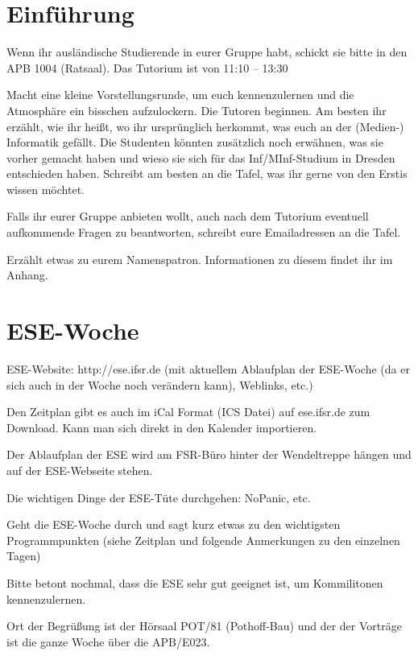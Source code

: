 \documentclass[a4paper,12pt]{report}
\begin{document}
\section{Einführung}
\begin{itemize*}
\item Wenn ihr ausländische Studierende in eurer Gruppe habt, schickt sie bitte in den APB 1004 (Ratsaal). Das Tutorium ist von 11:10 – 13:30\\
\item Macht eine kleine Vorstellungsrunde, um euch kennenzulernen und die Atmosphäre ein bisschen aufzulockern.
Die Tutoren beginnen.
Am besten ihr erzählt, wie ihr heißt, wo ihr ursprünglich herkommt, was euch an der (Medien-) Informatik gefällt.
Die Studenten könnten zusätzlich noch erwähnen, was sie vorher gemacht haben und wieso sie sich für das Inf/MInf-Studium in Dresden entschieden haben.
Schreibt am besten an die Tafel, was ihr gerne von den Erstis wissen möchtet.
\item Falls ihr eurer Gruppe anbieten wollt, auch nach dem Tutorium eventuell aufkommende Fragen zu beantworten, schreibt eure Emailadressen an die Tafel.
\item Erzählt etwas zu eurem Namenspatron. Informationen zu diesem findet ihr im Anhang.
\end{itemize*}

\section{ESE-Woche}
\begin{itemize*}
\item ESE-Website: http://ese.ifsr.de (mit aktuellem Ablaufplan der ESE-Woche (da er sich auch in der Woche noch verändern kann), Weblinks, etc.)
\item Den Zeitplan gibt es auch im iCal Format (ICS Datei) auf ese.ifsr.de zum Download.
Kann man sich direkt in den Kalender importieren.
\item Der Ablaufplan der ESE wird am FSR-Büro hinter der Wendeltreppe hängen und auf der ESE-Webseite stehen.
\item Die wichtigen Dinge der ESE-Tüte durchgehen: NoPanic, etc.
\item Geht die ESE-Woche durch und sagt kurz etwas zu den wichtigsten Programmpunkten (siehe Zeitplan und folgende Anmerkungen zu den einzelnen Tagen)
\item Bitte betont nochmal, dass die ESE sehr gut geeignet ist, um Kommilitonen kennenzulernen.
\end{itemize*}
\vspace{0.5cm}
Ort der Begrüßung ist der Hörsaal POT/81 (Pothoff-Bau) und der der Vorträge ist die ganze Woche über die APB/E023.
\end{document}
